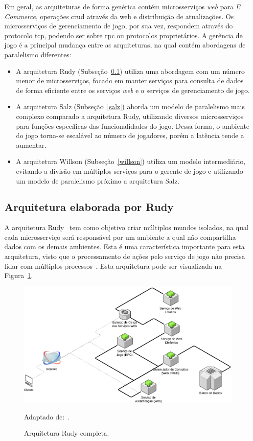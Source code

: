 Em geral, as arquiteturas de forma genérica contém microsserviços \textit{web} para \textit{E Commerce}, operações \ac{crud} através da web e distribuição de atualizações.
%
Os microsserviços de gerenciamento de jogo, por sua vez, respondem através do protocolo \ac{tcp}, podendo ser sobre \ac{rpc} ou protocolos proprietários.
%
A gerência de jogo é a principal mudança entre as arquiteturas, na qual contém abordagens de paralelismo diferentes:

\begin{itemize}
 \item A arquitetura Rudy (Subseção~\ref{rudy}) utiliza uma abordagem com um número menor de microsserviços, focado em manter serviços para consulta de dados de forma eficiente entre os serviços \textit{web} e o serviços de gerenciamento de jogo.
 \item A arquitetura Salz (Subseção~\ref{salz}) aborda um modelo de paralelismo mais complexo comparado a arquitetura Rudy, utilizando diversos microsserviços para funções específicas das funcionalidades do jogo.
%
Dessa forma, o ambiente do jogo torna-se escalável ao número de jogadores, porém a latência tende a aumentar.
\item A arquitetura Willson (Subseção~\ref{willson}) utiliza um modelo intermediário, evitando a divisão em múltiplos serviços para o gerente de jogo e utilizando um modelo de paralelismo próximo a arquitetura Salz.
\end{itemize}


\subsection{Arquitetura elaborada por Rudy}
\label{rudy}


A arquitetura Rudy~\cite{matthiasrudy2011} tem como objetivo criar múltiplos mundos isolados, na qual cada microsserviço será responsável por um ambiente a qual não compartilha dados com os demais ambientes.
%
Esta é uma característica importante para esta arquitetura, visto que o processamento de ações pelo serviço de jogo não precisa lidar com múltiplos processos~\cite{matthiasrudy2011}.
%
Esta arquitetura pode ser visualizada na Figura~\ref{full_rudy}.

\begin{figure}[htb!]
  \caption{Arquitetura Rudy completa.}
  \label{full_rudy}
  \includegraphics[width=\textwidth]{arquiteturas/full_rudy.png}
  \centering

  Adaptado de:~\cite{matthiasrudy2011}.
\end{figure}

